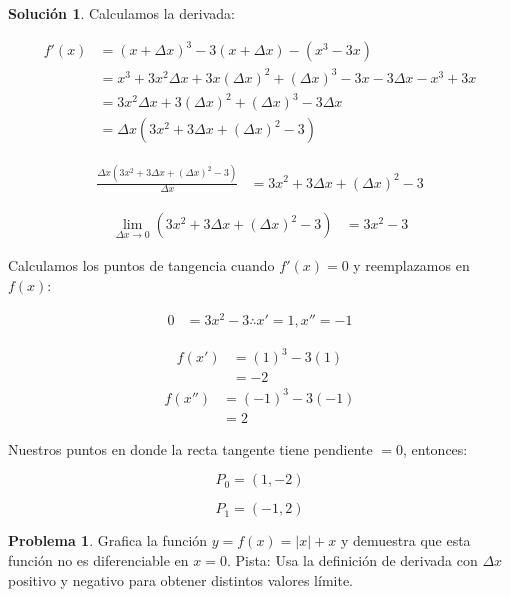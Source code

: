 \documentclass{article}
\theoremstyle{definition}
\newtheorem{problem}{Problema}
\newtheorem*{solution}{Solución}
\begin{document}
\medskip

\begin{solution}

Calculamos la derivada:

\begin{align*}
    f'(x) &= (x+\Delta x)^3-3(x+\Delta x)-(x^3-3x) \\
    &= x^3+3x^2\Delta x+3x(\Delta x)^2+(\Delta x)^3-3x-3\Delta x-x^3+3x \\
    &= 3x^2\Delta x+3(\Delta x)^2+(\Delta x)^3-3\Delta x \\
    &= \Delta x(3x^2+3\Delta x+(\Delta x)^2-3)
\end{align*}

\begin{align*}
    \frac{\Delta x(3x^2+3\Delta x+(\Delta x)^2-3)}{\Delta x} &= 3x^2+3\Delta x+(\Delta x)^2-3
\end{align*}

\begin{align*}
    \lim_{\Delta x \to 0} (3x^2+3\Delta x+(\Delta x)^2-3) &= 3x^2-3
\end{align*} 

Calculamos los puntos de tangencia cuando \( f'(x) = 0 \) y reemplazamos en \( f(x) \):

\begin{align*}
    0 &= 3x^2 - 3 \therefore x'=1, x'' = - 1
\end{align*}

\begin{align*}
    f(x') &= (1)^3-3(1) \\
    &= -2
\end{align*}
\begin{align*}
    f(x'') &= (-1)^3-3(-1) \\
    &= 2
\end{align*}

Nuestros puntos en donde la recta tangente tiene pendiente \( = 0 \), entonces:

\[
P_0 = (1, -2) 
\]

\[
P_1 = (-1, 2) 
\]
\end{solution}

\bigskip

\begin{problem}
Grafica la función \( y = f(x) = |x| + x \) y demuestra que esta función no es diferenciable en \( x = 0 \).  
Pista: Usa la definición de derivada con \( \Delta x \) positivo y negativo para obtener distintos valores límite.
\end{problem}
\end{document}
